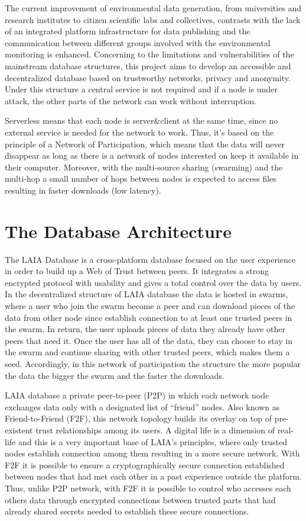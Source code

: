 \documentclass[conference,final,]{IEEEtran}
\begin{document}
The current improvement of environmental data generation, from universities
and research institutes to citizen scientific labs and collectives, contrasts
with the lack of an integrated platform infrastructure for data publishing
and the communication between different groups involved with the environmental
monitoring is enhanced. Concerning to the limitations and vulnerabilities
of the mainstream database structures, this project aims to develop an
accessible and decentralized database based on trustworthy networks, privacy
and anonymity. Under this structure a central service is not required and
if a node is under attack, the other parts of the network can work without
interruption.

Serverless means that each node is server\&client at the same time,
since no external service is needed for the network to work. Thus,
it's based on the principle of a Network of Participation, which means
that the data will never disappear as long as there is a network of
nodes interested on keep it available in their computer. Moreover, with
the multi-source sharing (swarming) and the multi-hop a small number of
hops between nodes is expected to access files resulting in faster
downloads (low latency).

\hypertarget{the-database-architecture}{%
\section{The Database Architecture}\label{the-database-architecture}}

The LAIA Database is a cross-platform database focused on the user
experience in order to build up a Web of Trust between peers. It
integrates a strong encrypted protocol with usability and gives a total
control over the data by users.
In the decentralized structure of LAIA database the data is hosted in
swarms, where a user who join the swarm become a peer and can download
pieces of the data from other node since establish connection to at
least one trusted peers in the swarm. In return, the user uploads
pieces of data they already have other peers that need it. Once the user
has all of the data, they can choose to stay in the swarm and
continue sharing with other trusted peers, which makes them a seed.
Accordingly, in this network of participation the structure the more
popular the data the bigger the swarm and the faster the downloads.

LAIA database a private peer-to-peer (P2P) in which each network node exchanges
data only with a designated list of ``friend'' nodes. Also known as
Friend-to-Friend (F2F), this network topology builds its overlay on top of
pre-existent trust relationships among its users. A digital life
is a dimension of real-life and this is a very important base of LAIA's
principles, where only trusted nodes establish connection among them
resulting in a more secure network. With F2F it is possible to ensure
a cryptographically secure connection established between nodes that
had met each other in a past experience outside the platform. Thus,
unlike P2P network, with F2F it is possible to control who accesses
each others data through encrypted connections between trusted parts
that had already shared secrets needed to establish these secure connections.
\end{document}
